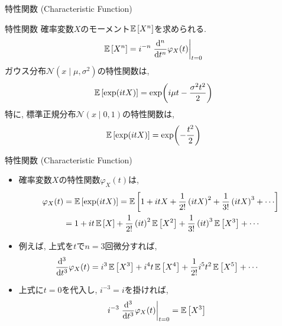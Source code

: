 \documentclass[dvipdfmx,notheorems,t]{beamer}
\begin{document}
\begin{frame}{特性関数 (Characteristic Function)}
\begin{block}{特性関数}
  確率変数$X$のモーメント$\operatorname{\mathbb{E}} \left[ X^n \right]$を求められる.
  \begin{align*}
    \operatorname{\mathbb{E}} \left[ X^n \right] = i^{-n} \left. \dv[n]{t} \varphi_X(t) \right|_{t = 0}
  \end{align*}
  ガウス分布$\mathcal{N}(x \mid \mu, \sigma^2)$の特性関数は,
  \begin{align*}
    \operatorname{\mathbb{E}} \left[ \exp(itX) \right] = \exp(i \mu t - \frac{\sigma^2 t^2}{2})
  \end{align*}
  特に, 標準正規分布$\mathcal{N}(x \mid 0, 1)$の特性関数は,
  \begin{align*}
    \operatorname{\mathbb{E}} \left[ \exp(itX) \right] = \exp(-\frac{t^2}{2})
  \end{align*}
\end{block}
\end{frame}

\begin{frame}{特性関数 (Characteristic Function)}
\begin{itemize}
  \item 確率変数$X$の特性関数$\varphi_X(t)$は,
  \begin{align*}
    \varphi_X(t) &= \E{\exp(itX)}
      = \E{1 + itX + \frac{1}{2!} \left( itX \right)^2 + \frac{1}{3!} \left( itX \right)^3 + \cdots} \\
      &= 1 + it \E{X} + \frac{1}{2!} \left( it \right)^2 \E{X^2} + \frac{1}{3!} \left( it \right)^3 \E{X^3} + \cdots
  \end{align*}
  \item 例えば, 上式を$t$で$n = 3$回微分すれば,
  \begin{align*}
    \dv[3]{t} \varphi_X(t)
      &= i^3 \operatorname{\mathbb{E}} \left[ X^3 \right] + i^4 t \operatorname{\mathbb{E}} \left[ X^4 \right] + \frac{1}{2!} i^5 t^2 \operatorname{\mathbb{E}} \left[ X^5 \right] + \cdots
  \end{align*}
  \item 上式に$t = 0$を代入し, $i^{-3} = i$を掛ければ,
  \begin{align*}
    i^{-3} \left. \dv[3]{t} \varphi_X(t) \right|_{t = 0} &= \operatorname{\mathbb{E}} \left[ X^3 \right]
  \end{align*}
\end{itemize}
\end{frame}
\end{document}
